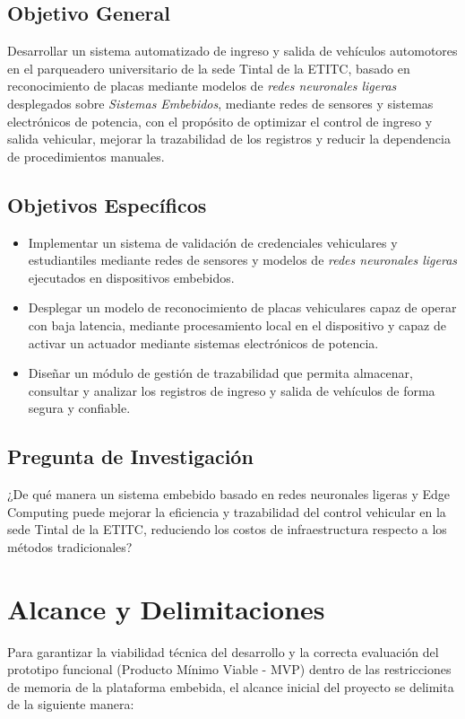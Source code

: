 \documentclass[12pt, letterpaper]{article}
\begin{document}
\subsection{Objetivo General}
Desarrollar un sistema automatizado de ingreso y salida de vehículos automotores en el parqueadero universitario de la sede Tintal de la ETITC, basado en reconocimiento de placas mediante modelos de \textit{redes neuronales ligeras} desplegados sobre \textit{Sistemas Embebidos}, mediante redes de sensores y sistemas electrónicos de potencia, con el propósito de optimizar el control de ingreso y salida vehicular, mejorar la trazabilidad de los registros y reducir la dependencia de procedimientos manuales.

\subsection{Objetivos Específicos}
\begin{itemize}
    \item Implementar un sistema de validación de credenciales vehiculares y estudiantiles mediante redes de sensores y modelos de \textit{redes neuronales ligeras} ejecutados en dispositivos embebidos.
    \item Desplegar un modelo de reconocimiento de placas vehiculares capaz de operar con baja latencia, mediante procesamiento local en el dispositivo y capaz de activar un actuador mediante sistemas electrónicos de potencia.
    \item Diseñar un módulo de gestión de trazabilidad que permita almacenar, consultar y analizar los registros de ingreso y salida de vehículos de forma segura y confiable.
\end{itemize}

\subsection{Pregunta de Investigación}
¿De qué manera un sistema embebido basado en redes neuronales ligeras y Edge Computing puede mejorar la eficiencia y trazabilidad del control vehicular en la sede Tintal de la ETITC, reduciendo los costos de infraestructura respecto a los métodos tradicionales?

\section{Alcance y Delimitaciones}
Para garantizar la viabilidad técnica del desarrollo y la correcta evaluación del prototipo funcional (Producto Mínimo Viable - MVP) dentro de las restricciones de memoria de la plataforma embebida, el alcance inicial del proyecto se delimita de la siguiente manera:
\end{document}
